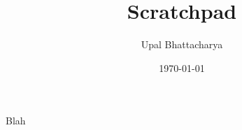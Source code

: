 \documentclass[a4paper]{article}
\author{Upal Bhattacharya}
\date{\today}
\title{Scratchpad}
\begin{document}
\maketitle

\linenumbers

Blah
\end{document}
